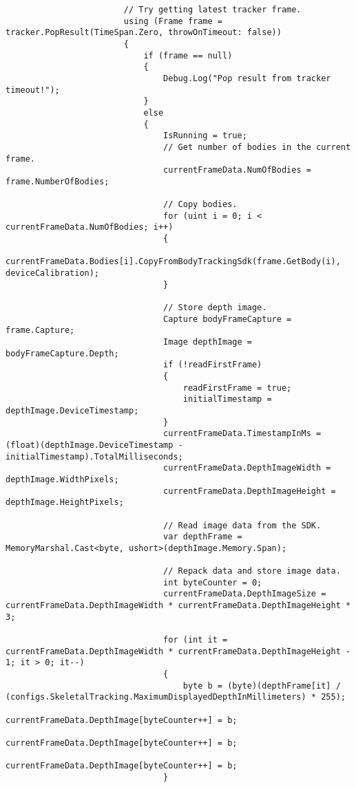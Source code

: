 \begin{verbatim}
                        // Try getting latest tracker frame.
                        using (Frame frame = tracker.PopResult(TimeSpan.Zero, throwOnTimeout: false))
                        {
                            if (frame == null)
                            {
                                Debug.Log("Pop result from tracker timeout!");
                            }
                            else
                            {
                                IsRunning = true;
                                // Get number of bodies in the current frame.
                                currentFrameData.NumOfBodies = frame.NumberOfBodies;

                                // Copy bodies.
                                for (uint i = 0; i < currentFrameData.NumOfBodies; i++)
                                {
                                    currentFrameData.Bodies[i].CopyFromBodyTrackingSdk(frame.GetBody(i), deviceCalibration);
                                }

                                // Store depth image.
                                Capture bodyFrameCapture = frame.Capture;
                                Image depthImage = bodyFrameCapture.Depth;
                                if (!readFirstFrame)
                                {
                                    readFirstFrame = true;
                                    initialTimestamp = depthImage.DeviceTimestamp;
                                }
                                currentFrameData.TimestampInMs = (float)(depthImage.DeviceTimestamp - initialTimestamp).TotalMilliseconds;
                                currentFrameData.DepthImageWidth = depthImage.WidthPixels;
                                currentFrameData.DepthImageHeight = depthImage.HeightPixels;

                                // Read image data from the SDK.
                                var depthFrame = MemoryMarshal.Cast<byte, ushort>(depthImage.Memory.Span);

                                // Repack data and store image data.
                                int byteCounter = 0;
                                currentFrameData.DepthImageSize = currentFrameData.DepthImageWidth * currentFrameData.DepthImageHeight * 3;

                                for (int it = currentFrameData.DepthImageWidth * currentFrameData.DepthImageHeight - 1; it > 0; it--)
                                {
                                    byte b = (byte)(depthFrame[it] / (configs.SkeletalTracking.MaximumDisplayedDepthInMillimeters) * 255);
                                    currentFrameData.DepthImage[byteCounter++] = b;
                                    currentFrameData.DepthImage[byteCounter++] = b;
                                    currentFrameData.DepthImage[byteCounter++] = b;
                                }


\end{verbatim}
